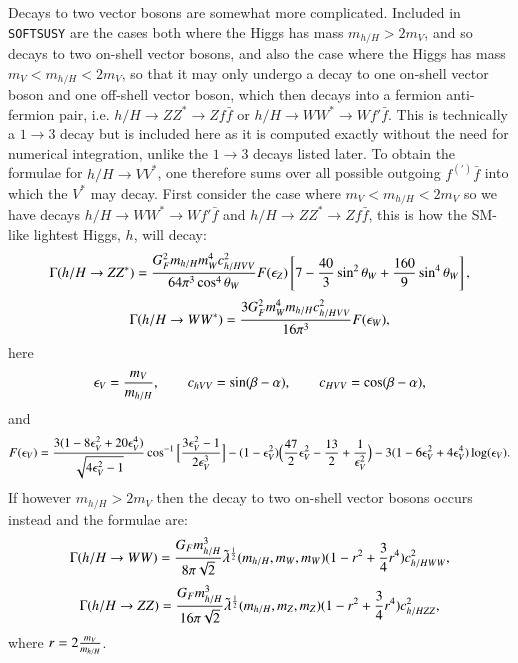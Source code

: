 \documentclass[final,3p,times,pdflatex]{elsarticle}
\begin{document}
Decays to two vector bosons are somewhat more complicated. Included in {\tt {\tt SOFTSUSY}} are the cases both where the Higgs has mass $m_{h/H} > 2m_V $, and so decays to two on-shell vector bosons, and also the case where the Higgs has mass $m_V < m_{h/H} < 2m_V$, so that it may only undergo a decay to one on-shell vector boson and one off-shell vector boson, which then decays into a fermion anti-fermion pair, i.e. $h/H \rightarrow ZZ^* \rightarrow Zf\bar{f}$ or $h/H \rightarrow WW^* \rightarrow Wf'\bar{f}$. This is technically a $1 \rightarrow 3$ decay but is included here as it is computed exactly without the need for numerical integration, unlike the $1 \rightarrow 3$ decays listed later. To obtain the formulae for $h/H \rightarrow VV^*$, one therefore sums over all possible outgoing $f^{(')}\bar{f}$ into which the $V^*$ may decay.
First consider the case where $m_V < m_{h/H} < 2m_V$ so we have decays $h/H \rightarrow WW^* \rightarrow Wf'\bar{f}$ and $h/H \rightarrow ZZ^* \rightarrow Zf\bar{f}$, this is how the SM-like lightest Higgs, $h$, will decay:
\begin{equation} \label{hZZstar}
\Gamma(h/H \rightarrow ZZ^*) = {G_{F}^2 m_{h/H} m_{W}^4 c_{h/HVV}^2 \over 64 \pi^3 \cos^4 \theta_W} F(\epsilon_{Z}) \left[7 - {40 \over 3} \sin^2 \theta_W + {160 \over 9} \sin^4 \theta_W\right],
\end{equation} 
\begin{equation} \label{hWWstar}
\Gamma(h/H \rightarrow WW^*) = {3 G_{F}^2 m_{W}^4 m_{h/H} c_{h/HVV}^2 \over 16 \pi^3}  F(\epsilon_{W}) ,
\end{equation} 
here
\begin{equation}
\epsilon_{V} = {m_V \over m_{h/H}}, \quad \quad c_{hVV} = \sin(\beta-\alpha), \quad \quad c_{HVV} = \cos(\beta-\alpha),
\end{equation}
and 
\begin{equation}
\begin{aligned}
F(\epsilon_{V}) = {3(1-8\epsilon_{V}^2 + 20\epsilon_{V}^4) \over \sqrt{4\epsilon_{V}^2-1}}\cos^{-1}\Big[{3\epsilon_{V}^2-1 \over 2\epsilon_{V}^3}\Big] - (1-\epsilon_{V}^2)\Big({47 \over 2}\epsilon_{V}^2 -{13 \over 2} + {1 \over \epsilon_{V}^2}\Big) - 3(1-6\epsilon_{V}^2+4\epsilon_{V}^4)\log(\epsilon_{V}).
\end{aligned}
\end{equation}
If however $m_{h/H} > 2m_{V}$ then the decay to two on-shell vector bosons occurs instead and the formulae are:
\begin{equation} \label{hWW}
\Gamma(h/H \rightarrow WW) = {G_{F} m_{h/H}^3 \over 8\pi \sqrt{2}} \tilde{\lambda}^{1 \over 2}(m_{h/H},m_{W},m_{W})(1-r^2 + {3 \over 4}r^4)c_{h/HWW}^2,
\end{equation}
\begin{equation} \label{hZZ}
\Gamma(h/H \rightarrow ZZ) = {G_{F} m_{h/H}^3 \over 16\pi \sqrt{2}} \tilde{\lambda}^{1 \over 2}(m_{h/H},m_{Z},m_{Z})(1-r^2 + {3 \over 4}r^4)c_{h/HZZ}^2,
\end{equation}
where $r = 2{m_{V} \over m_{h/H}}$.
\end{document}

